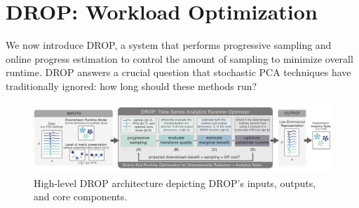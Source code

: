 \section{DROP: Workload Optimization}
\label{sec:algo}


We now introduce DROP, a system that performs progressive sampling and online progress estimation to control the amount of sampling to minimize overall runtime. 
DROP answers a crucial question that stochastic PCA techniques have traditionally ignored: how long should these methods run? 

\begin{figure}
\label{fig:arch}
\begin{center}
\includegraphics[width=\textwidth]{figs/system_arch.pdf}\vspace{-1em}
\caption[]{High-level DROP architecture depicting DROP's inputs, outputs, and core components.}
\end{center}
\vspace{-1em}
\end{figure}



